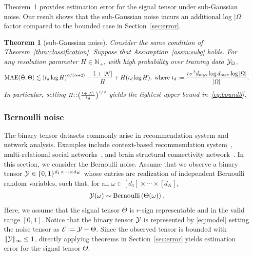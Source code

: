 \documentclass[twoside,11pt]{article}
\theoremstyle{plain}
\newtheorem{thm}{Theorem}
\theoremstyle{definition}
\begin{document}
Theorem~\ref{thm:unbddno1} provides estimation error for the signal tensor under sub-Gaussian noise. Our result shows that the sub-Gaussian noise incurs an additional log $|\Omega|$ factor compared to the bounded case in Section~\ref{sec:error}. 

\begin{thm}[sub-Gaussian noise]\label{thm:unbddno1}
Consider the same condition of Theorem~\ref{thm:classification}.  Suppose that Assumption~\ref{assm:subg} holds.
For any resolution parameter $H\in\mathbb{N}_{+}$, with high probability over training data $\mathcal{Y}_\Omega$,
\begin{equation}\label{eq:bound3}
\textup{MAE}(\hat \Theta, \Theta)\lesssim \left(t_d\log H\right)^{\alpha/(\alpha+2)}+{1+|\mathcal{N}|\over H}+{H( t_d\log H)},\text{ where } t_d :={ r\sigma^2d_{\max}\log d_{\max}\log |\Omega|\over |\Omega|}.
\end{equation}
In particular, setting $\scriptstyle H\asymp \left({1+|\mathcal{N}|\over t_d} \right)^{1/2}$ yields the tightest upper bound in~\eqref{eq:bound3}.

\end{thm}


\subsubsection{Bernoulli noise}
The binary tensor datasets commonly arise in recommendation system and network analysis. Examples include context-based recommendation system~\citep{adomavicius2011context}, multi-relational social networks~\citep{nickel2011three}, and brain structural connectivity network~\citep{wang2019common}. In this section, we consider the Bernoulli noise.
Assume that we observe a binary tensor $\mathcal{Y}\in\{0,1\}^{d_1\times \cdots\times d_K}$  
whose entries are realization of independent Bernoulli random variables, such that, for all $\omega\in[d_1]\times \cdots\times [d_K]$,
\begin{align}\label{eq:bernoulli}
    \mathcal{Y}(\omega)\sim \text{Bernoulli}\left(\Theta(\omega)\right).
\end{align}
Here, we assume that the signal tensor $\Theta$ is $r$-sign representable and in the valid range $[0,1]$.   Notice that the binary tensor $\mathcal{Y}$  is represented by \eqref{eq:model} setting the noise tensor as $\mathcal{E}:= \mathcal{Y} -\Theta$. Since the observed tensor is bounded with $\|\mathcal{Y}\|_\infty\leq 1$, directly applying theorems in Section~\ref{sec:error} yields estimation error for the signal tensor $\Theta.$
\end{document}
